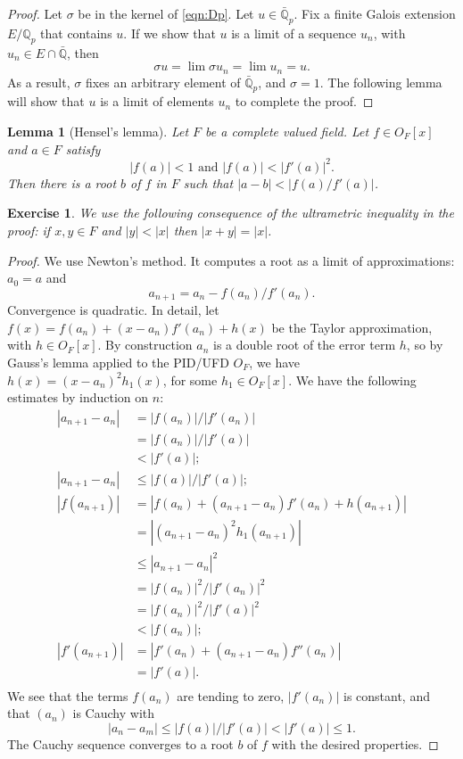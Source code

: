 \documentclass{amsart}
\newcommand{\ring}[1]{\mathbb{#1}}
\newtheorem{lemma}[equation]{Lemma}
\newtheorem{exercise}{Exercise}
\def\abs#1{{|#1|}}
\begin{document}
\begin{proof}
  Let $\sigma$ be in the kernel of \eqref{eqn:Dp}.  Let $u\in
  \bar{\ring{Q}}_p$.  Fix a finite Galois extension $E/\ring{Q}_p$
  that contains $u$.  If we show that $u$ is a limit of a sequence
  $u_n$, with $u_n\in E\cap \bar{\ring{Q}}$, then
\[
\sigma u = \lim \sigma u_n = \lim u_n = u.
\]
As a result, $\sigma$ fixes an arbitrary element of
$\bar{\ring{Q}}_p$, and $\sigma=1$.  The following lemma will show
that $u$ is a limit of elements $u_n$ to complete the proof.
\end{proof}

\begin{lemma}[Hensel's lemma] Let $F$ be a complete valued field.
Let $f\in O_F[x]$ and $a\in F$ satisfy
\[
\abs{f(a)}<1 \text{ and } \abs{f(a)} < \abs{f'(a)}^2. 
\]
Then there is a root $b$ of $f$ in $F$ such that $\abs{a-b}<\abs{f(a)/f'(a)}$.
\end{lemma}

\begin{exercise}  We use the following consequence
of the ultrametric inequality in the proof: if $x,y\in F$
and $\abs{y}<\abs{x}$ then $\abs{x + y}  = \abs{x}$.
\end{exercise}

\begin{proof} We use Newton's method.  It computes a root as a limit
of approximations:  $a_0=a$ and
\[
 a_{n+1} = a_n - f(a_n)/f'(a_n).
\]
Convergence is quadratic.  In detail, let $f(x) = f(a_n) + (x-a_n)
f'(a_n) + h(x)$ be the Taylor approximation, with $h\in O_F[x]$.  By
construction $a_n$ is a double root of the error term $h$, 
so by Gauss's lemma \cite[8.18]{knapp-basic}
applied to the PID/UFD $O_F$, we have $h(x) = (x-a_n)^2 h_1(x)$, for
some $h_1\in O_F[x]$. We have the following estimates by induction on $n$:
\begin{align*}
\abs{a_{n+1}-a_n} &= \abs{f(a_n)}/\abs{f'(a_{n})} \\
   &= \abs{f(a_n)}/\abs{f'(a)}\\
   &< \abs{f'(a)};\\
\abs{a_{n+1}-a_n} &\le \abs{f(a)}/\abs{f'(a)};\\
\abs{f(a_{n+1})} &= \abs{f(a_n) +(a_{n+1}-a_n) f'(a_n) + h(a_{n+1})}\\
 &= \abs{(a_{n+1}-a_n)^2h_1(a_{n+1})}\\
 &\le \abs{a_{n+1}-a_n}^2\\
 &= \abs{f(a_n)}^2/\abs{f'(a_{n})}^2\\
 &= \abs{f(a_n)}^2/\abs{f'(a)}^2\\
 &< \abs{f(a_n)};\\
\abs{f'(a_{n+1})} &= \abs{f'(a_{n}) + (a_{n+1}-a_n) f''(a_n)} \\
  &=\abs{f'(a)}.\\
\end{align*}
We see that the terms $f(a_n)$ are tending to zero, $\abs{f'(a_n)}$ is
constant, and that $(a_n)$ is Cauchy with 
\[
\abs{a_n-a_m}\le
\abs{f(a)}/\abs{f'(a)}< \abs{f'(a)}\le 1.
\]  The Cauchy sequence converges to a root $b$ of $f$ with the desired properties.
\end{proof}
\end{document}
